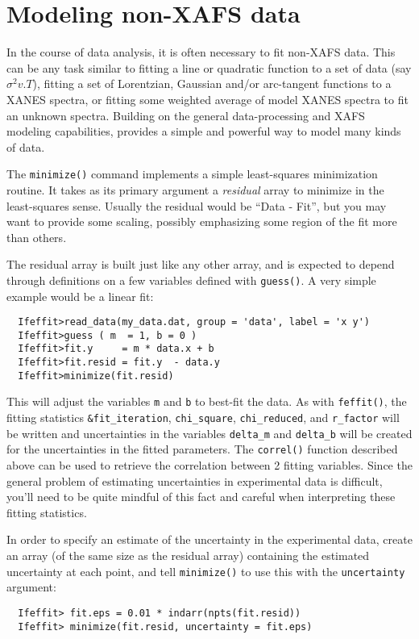 \documentclass[11pt]{article}
\begin{document}
\clearpage
\section{Modeling non-XAFS data}\label{s:minimize}

In the course of data analysis, it is often necessary to fit non-XAFS data.
This can be any task similar to fitting a line or quadratic function to a
set of data (say $\sigma^2 v. T$), fitting a set of Lorentzian, Gaussian
and/or arc-tangent functions to a XANES spectra, or fitting some weighted
average of model XANES spectra to fit an unknown spectra.  Building on the
general data-processing and XAFS modeling capabilities, {\ifeffit}
provides a simple and powerful way to model many kinds of data.

The {\tt{minimize()}} command implements a simple least-squares
minimization routine.  It takes as its primary argument a {\emph{residual}}
array to minimize in the least-squares sense.  Usually the residual would
be ``Data - Fit'', but you may want to provide some scaling, possibly
emphasizing some region of the fit more than others.

The residual array is built just like any other array, and is expected to
depend through definitions on a few variables defined with {\tt{guess()}}.
A very simple example would be a linear fit:
{\small\begin{verbatim}
  Ifeffit>read_data(my_data.dat, group = 'data', label = 'x y')
  Ifeffit>guess ( m  = 1, b = 0 )
  Ifeffit>fit.y     = m * data.x + b
  Ifeffit>fit.resid = fit.y  - data.y
  Ifeffit>minimize(fit.resid)
\end{verbatim}
}\noindent
This will adjust the variables {\tt{m}} and {\tt{b}} to best-fit the data.
As with {\tt{feffit()}}, the fitting statistics {\tt{\&fit\_iteration}},
{\tt{chi\_square}}, {\tt{chi\_reduced}}, and {\tt{r\_factor}} will be
written and uncertainties in the variables {\tt{delta\_m}} and
{\tt{delta\_b}} will be created for the uncertainties in the fitted
parameters.  The {\tt{correl()}} function described above can be used to
retrieve the correlation between 2 fitting variables. Since the general
problem of estimating uncertainties in experimental data is difficult,
you'll need to be quite mindful of this fact and careful when interpreting
these fitting statistics.

In order to specify an estimate of the uncertainty in the experimental
data, create an array (of the same size as the residual array) containing
the estimated  uncertainty at each point, and tell {\tt{minimize()}} to use
this with the {\tt{uncertainty}} argument:
{\small\begin{verbatim}
  Ifeffit> fit.eps = 0.01 * indarr(npts(fit.resid))
  Ifeffit> minimize(fit.resid, uncertainty = fit.eps)
\end{verbatim}
}\noindent
\end{document}
